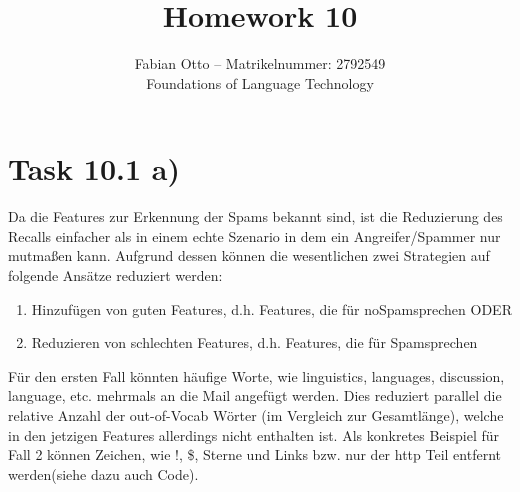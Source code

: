 \documentclass[12pt]{scrartcl}
\begin{document}
    \title{Homework 10}
    \author{Fabian Otto -- Matrikelnummer: 2792549\\
    Foundations of Language Technology}
    \maketitle
    

	\section*{Task 10.1 a)}
	Da die Features zur Erkennung der Spams bekannt sind, ist die Reduzierung des Recalls einfacher als in einem echte Szenario in dem ein Angreifer/Spammer nur mutmaßen kann.
	Aufgrund dessen können die wesentlichen zwei Strategien auf folgende Ansätze reduziert werden:
	\begin{enumerate}
		\item Hinzufügen von \glqq{}guten\grqq{} Features, d.h. Features, die für \glqq{}noSpam\grqq sprechen ODER
		\item Reduzieren von \glqq{}schlechten\grqq{} Features, d.h. Features, die für \glqq{}Spam\grqq sprechen
	\end{enumerate}
	
	Für den ersten Fall könnten häufige Worte, wie \glqq{}linguistics\grqq{}, \glqq{}languages\grqq{}, \glqq{}discussion\grqq{}, \glqq{}language\grqq{}, etc. mehrmals an die Mail angefügt werden. Dies reduziert  parallel die relative Anzahl der out-of-Vocab Wörter (im Vergleich zur Gesamtlänge), welche in den jetzigen Features allerdings nicht enthalten ist. 
	Als konkretes Beispiel für Fall 2 können Zeichen, wie !, \$, Sterne und Links bzw. nur der \glqq{}http\grqq{} Teil entfernt werden(siehe dazu auch Code).
	
\end{document}
